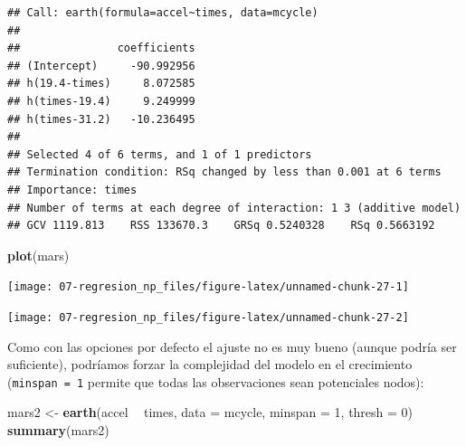 \documentclass[
]{book}
\newenvironment{Shaded}{\begin{snugshade}}{\end{snugshade}}
\newcommand{\DataTypeTok}[1]{\textcolor[rgb]{0.13,0.29,0.53}{#1}}
\newcommand{\DecValTok}[1]{\textcolor[rgb]{0.00,0.00,0.81}{#1}}
\newcommand{\KeywordTok}[1]{\textcolor[rgb]{0.13,0.29,0.53}{\textbf{#1}}}
\newcommand{\NormalTok}[1]{#1}
\newcommand{\OperatorTok}[1]{\textcolor[rgb]{0.81,0.36,0.00}{\textbf{#1}}}
\newcommand{\StringTok}[1]{\textcolor[rgb]{0.31,0.60,0.02}{#1}}
\theoremstyle{break}
\theoremstyle{definition}
\theoremstyle{definition}
\theoremstyle{definition}
\theoremstyle{remark}
\begin{document}
\begin{verbatim}
## Call: earth(formula=accel~times, data=mcycle)
## 
##               coefficients
## (Intercept)     -90.992956
## h(19.4-times)     8.072585
## h(times-19.4)     9.249999
## h(times-31.2)   -10.236495
## 
## Selected 4 of 6 terms, and 1 of 1 predictors
## Termination condition: RSq changed by less than 0.001 at 6 terms
## Importance: times
## Number of terms at each degree of interaction: 1 3 (additive model)
## GCV 1119.813    RSS 133670.3    GRSq 0.5240328    RSq 0.5663192
\end{verbatim}

\begin{Shaded}
\begin{Highlighting}[]
\KeywordTok{plot}\NormalTok{(mars)}
\end{Highlighting}
\end{Shaded}

\begin{center}\texttt{[image: 07-regresion\_np\_files/figure-latex/unnamed-chunk-27-1]} \end{center}

\begin{Shaded}
\end{Shaded}

\begin{center}\texttt{[image: 07-regresion\_np\_files/figure-latex/unnamed-chunk-27-2]} \end{center}

Como con las opciones por defecto el ajuste no es muy bueno (aunque podría ser suficiente), podríamos forzar la complejidad del modelo en el crecimiento (\texttt{minspan\ =\ 1} permite que todas las observaciones sean potenciales nodos):

\begin{Shaded}
\begin{Highlighting}[]
\NormalTok{mars2 <-}\StringTok{ }\KeywordTok{earth}\NormalTok{(accel }\OperatorTok{~}\StringTok{ }\NormalTok{times, }\DataTypeTok{data =}\NormalTok{ mcycle, }\DataTypeTok{minspan =} \DecValTok{1}\NormalTok{, }\DataTypeTok{thresh =} \DecValTok{0}\NormalTok{)}
\KeywordTok{summary}\NormalTok{(mars2)}
\end{Highlighting}
\end{Shaded}
\end{document}
